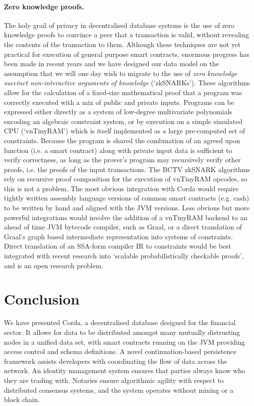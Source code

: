 \documentclass{article}
\begin{document}
\paragraph{Zero knowledge proofs.}The holy grail of privacy in decentralised database systems is the use of zero
knowledge proofs to convince a peer that a transaction is valid, without revealing the contents of the transaction to
them. Although these techniques are not yet practical for execution of general purpose smart contracts, enormous
progress has been made in recent years and we have designed our data model on the assumption that we will one day wish
to migrate to the use of \emph{zero knowledge succinct non-interactive arguments of knowledge}\cite{184425}
(`zkSNARKs'). These algorithms allow for the calculation of a fixed-size mathematical proof that a program was correctly
executed with a mix of public and private inputs. Programs can be expressed either directly as a system of low-degree
multivariate polynomials encoding an algebraic constraint system, or by execution on a simple simulated CPU (`vnTinyRAM') which is itself
implemented as a large pre-computed set of constraints. Because the program is shared the combination of an
agreed upon function (i.e. a smart contract) along with private input data is sufficient to verify correctness,
as long as the prover's program may recursively verify other proofs, i.e. the proofs of the input transactions.
The BCTV zkSNARK algorithms rely on recursive proof composition for the execution of vnTinyRAM opcodes, so this is not a
problem. The most obvious integration with Corda would require tightly written assembly language versions of common
smart contracts (e.g. cash) to be written by hand and aligned with the JVM versions. Less obvious but more powerful
integrations would involve the addition of a vnTinyRAM backend to an ahead of time JVM bytecode compiler, such as
Graal\cite{Graal}, or a direct translation of Graal's graph based intermediate representation into systems of constraints.
Direct translation of an SSA-form compiler IR to constraints would be best integrated with recent research
into `scalable probabilistically checkable proofs'\cite{cryptoeprint:2016:646}, and is an open research problem.

\section{Conclusion}

We have presented Corda, a decentralised database designed for the financial sector. It allows for data to be
distributed amongst many mutually distrusting nodes in a unified data set, with smart contracts running on the JVM
providing access control and schema definitions. A novel continuation-based persistence framework assists
developers with coordinating the flow of data across the network. An identity management system ensures that
parties always know who they are trading with. Notaries ensure algorithmic agility with respect to distributed
consensus systems, and the system operates without mining or a block chain.
\end{document}
